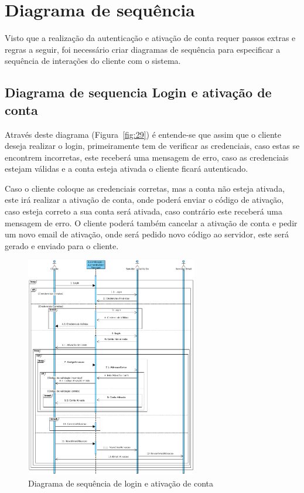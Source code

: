 \newpage

\section{Diagrama de sequência}

Visto que a realização da autenticação e ativação de conta requer passos extras e regras a seguir, foi necessário criar diagramas de sequência para especificar a sequência de interações do cliente com o sistema.

\subsection{Diagrama de sequencia Login e ativação de conta}

Através deste diagrama (Figura~\ref{fig:29}) é entende-se que assim que o cliente deseja realizar o login, primeiramente tem de verificar as credenciais, caso estas se encontrem incorretas, este receberá uma mensagem de erro, caso as credenciais estejam válidas e a conta esteja ativada o cliente ficará autenticado. 

Caso o cliente coloque as credenciais corretas, mas a conta não esteja ativada, este irá realizar a ativação de conta, onde poderá enviar o código de ativação, caso esteja correto a sua conta será ativada, caso contrário este receberá uma mensagem de erro. O cliente poderá também cancelar a ativação de conta e pedir um novo email de ativação, onde será pedido novo código ao servidor, este será gerado e enviado para o cliente.

\begin{figure}[htb]
    \centering
    \includegraphics[width=0.67\textwidth]{images/diagramas/sequencia/diagrama_login.png}
    \caption{Diagrama de sequência de login e ativação de conta}
    \label{fig:30}
\end{figure}

